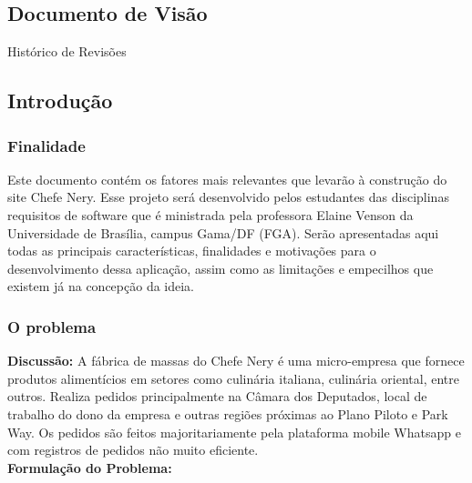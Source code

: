 \begin{apendicesenv}

\partapendices

\chapter{Documento de Visão}

\tab Histórico de Revisões




{\large {\section { Introdução \\ } } }

{\subsection {Finalidade\\ }}
\tab Este documento contém os fatores mais relevantes que levarão à construção do site Chefe Nery. Esse projeto será desenvolvido pelos estudantes das disciplinas requisitos de software que é ministrada pela professora Elaine Venson da Universidade de Brasília, campus Gama/DF (FGA). Serão apresentadas aqui todas as principais características, finalidades e motivações para o desenvolvimento dessa aplicação, assim como as limitações e empecilhos que existem já na concepção da ideia.
\\

{\subsection {O problema\\ }}
\textbf{Discussão:} A fábrica de massas do Chefe Nery é uma micro-empresa que fornece produtos alimentícios em setores como culinária italiana, culinária oriental, entre outros. Realiza pedidos principalmente na Câmara dos Deputados, local de trabalho do dono da empresa e outras regiões próximas ao Plano Piloto e Park Way. Os pedidos são feitos majoritariamente pela plataforma mobile Whatsapp e com registros de pedidos não muito eficiente. \\
\textbf{Formulação do Problema:}



\end{apendicesenv}
